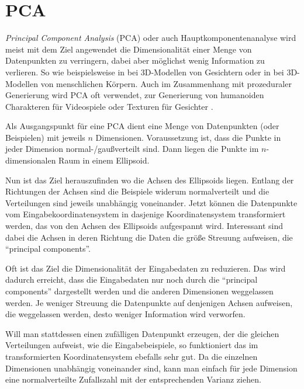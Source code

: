 \section{PCA} %
\label{PCA}

 
 \emph{Principal Component Analysis} (PCA) oder auch Hauptkomponentenanalyse \cite{PCA} wird meist mit dem Ziel angewendet die Dimensionalität einer Menge von Datenpunkten zu verringern, dabei aber möglichst wenig Information zu verlieren.
 So wie beispielsweise in \cite{PCA_faces} bei 3D-Modellen von Gesichtern oder in \cite{PCA_bodies} bei 3D-Modellen von menschlichen Körpern. Auch im Zusammenhang mit prozeduraler Generierung wird PCA oft verwendet, \zb zur Generierung von humanoiden Charakteren für Videospiele \cite{ProceduralCharacterGeneration} oder Texturen für Gesichter \cite{GeneratingFacialTextures}.
 
 Als Ausgangspunkt für eine PCA dient eine Menge von Datenpunkten (oder Beispielen) mit jeweils $n$ Dimensionen. Voraussetzung ist, dass die Punkte in jeder Dimension normal-/gaußverteilt sind. Dann liegen die Punkte im $n$-dimensionalen Raum in einem Ellipsoid.
 
 Nun ist das Ziel herauszufinden wo die Achsen des Ellipsoids liegen. Entlang der Richtungen der Achsen sind die Beispiele widerum normalverteilt und die Verteilungen sind jeweils unabhängig voneinander.
 Jetzt können die Datenpunkte vom Eingabekoordinatensystem in dasjenige Koordinatensystem transformiert werden, das von den Achsen des Ellipsoids aufgespannt wird. Interessant sind dabei die Achsen in deren Richtung die Daten die größe Streuung aufweisen, die "`principal components"'. 
 
 Oft ist das Ziel die Dimensionalität der Eingabedaten zu reduzieren. Das wird dadurch erreicht, dass die Eingabedaten nur noch durch die "`principal components"' dargestellt werden und die anderen Dimensionen weggelassen werden. Je weniger Streuung die Datenpunkte auf denjenigen Achsen aufweisen, die weggelassen werden, desto weniger Information wird verworfen.
 
 Will man stattdessen einen zufälligen Datenpunkt erzeugen, der die gleichen Verteilungen aufweist, wie die Eingabebeispiele, so funktioniert das im transformierten Koordinatensystem ebefalls sehr gut. Da die einzelnen Dimensionen unabhängig voneinander sind, kann man einfach für jede Dimension eine normalverteilte Zufallszahl mit der entsprechenden Varianz ziehen.
 
